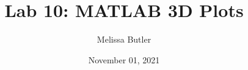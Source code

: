 \newcommand{\course}{MATH 3341}
\title{Lab 10: MATLAB 3D Plots}
\author{Melissa Butler}
\date{November 01, 2021}
